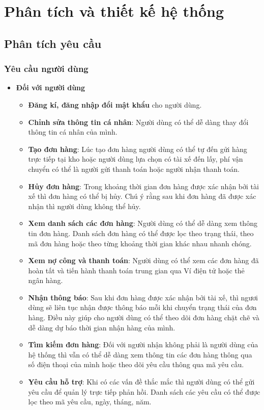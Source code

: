 \chapter{Phân tích và thiết kế hệ thống}

\section{Phân tích yêu cầu}
    \subsection{Yêu cầu người dùng}
    	\begin{itemize}
				\item \textbf{Đối với người dùng}
					\begin{itemize}
				        \item \textbf{Đăng kí, đăng nhập đổi mật khẩu} cho người dùng.
				        \item \textbf{Chỉnh sửa thông tin cá nhân}: Người dùng có thể dễ dàng thay đổi thông tin cá nhân của mình.
				        \item \textbf{Tạo đơn hàng}: Lúc tạo đơn hàng người dùng có thể tự đến gửi hàng trực tiếp tại kho hoặc người dùng lựa chọn có tài xế đến lấy, phí vận chuyển có thể là người gửi thanh toán hoặc người nhận thanh toán.
				        \item \textbf{Hủy đơn hàng}: Trong khoảng thời gian đơn hàng được xác nhận bởi tài xế thì đơn hàng có thể bị hủy. Chú ý rằng sau khi đơn hàng đã được xác nhận thì người dùng không thể hủy.
				        \item \textbf{Xem danh sách các đơn hàng}: Người dùng có thể dễ dàng xem thông tin đơn hàng. Danh sách đơn hàng có thể được lọc theo trạng thái, theo mã đơn hàng hoặc theo từng khoảng thời gian khác nhau nhanh chóng.
				        \item \textbf{Xem nợ công và thanh toán}: Người dùng có thể xem các đơn hàng đã hoàn tất và tiến hành thanh toán trung gian qua Ví điện tử hoặc thẻ ngân hàng.

				        \item \textbf{Nhận thông báo}: Sau khi đơn hàng được xác nhận bởi tài xế, thì ngươi dùng sẽ liên tục nhận được thông báo mỗi khi chuyển trạng thái của đơn hàng. Điều này giúp cho người dùng có thể theo dõi đơn hàng chặt chẽ và dễ dàng dự báo thời gian nhận hàng của mình.

				        \item \textbf{Tìm kiếm đơn hàng}: Đối với người nhận không phải là người dùng của hệ thống thì vẫn có thể dễ dàng xem thông tin các đơn hàng thông qua số điện thoại của mình hoặc theo dõi yêu cầu thông qua mã yêu cầu.
				        \item \textbf{Yêu cầu hỗ trợ}: Khi có các vấn đề thắc mắc thì người dùng có thể gửi yêu cầu để quản lý trực tiếp phản hồi. Danh sách các yêu cầu có thể được lọc theo mã yêu cầu, ngày, tháng, năm.
				        

\end{itemize}
\end{itemize}
